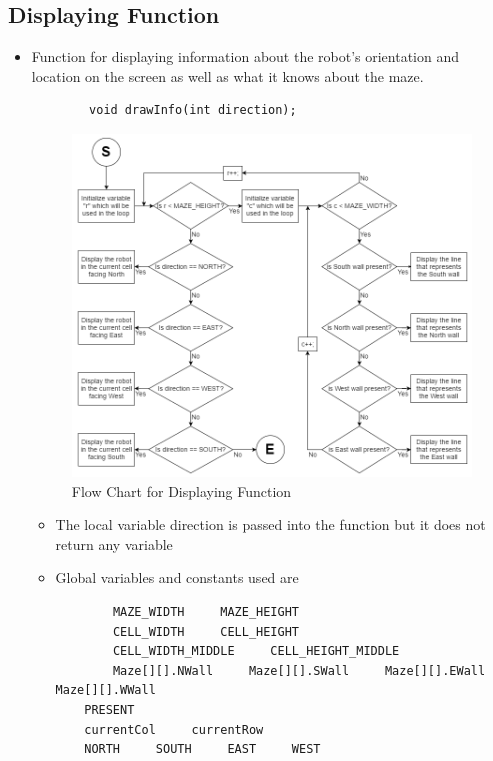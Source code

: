 \documentclass[11pt]{article}
\begin{document}
\subsection{Displaying Function}
\begin{itemize}
\item Function for displaying information about the robot's orientation and location on the screen as well as what it knows about the maze. 
	\begin{verbatim}
		void drawInfo(int direction);
	\end{verbatim}
\begin{figure}[htp]
\centering
\includegraphics[scale=0.57]{images/Software_Flowchart/Drawing_Function.png}
\caption{Flow Chart for Displaying Function}
\label{}
\end{figure}
	\begin{itemize}
	\item The local variable direction is passed into the function but it does not return any variable
	\item Global variables and constants used are
	\begin{verbatim}
		MAZE_WIDTH     MAZE_HEIGHT
		CELL_WIDTH     CELL_HEIGHT
		CELL_WIDTH_MIDDLE     CELL_HEIGHT_MIDDLE
		Maze[][].NWall     Maze[][].SWall     Maze[][].EWall     Maze[][].WWall
	PRESENT
	currentCol     currentRow
	NORTH     SOUTH     EAST     WEST
	\end{verbatim}
	\end{itemize}
\end{itemize}
\newpage
\end{document}
